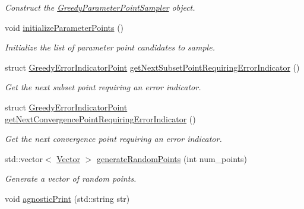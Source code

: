 \begin{DoxyCompactItemize}
\begin{DoxyCompactList}\small\item\em Construct the \hyperlink{class_c_a_r_o_m_1_1_greedy_parameter_point_sampler}{Greedy\-Parameter\-Point\-Sampler} object. \end{DoxyCompactList}\item 
\hypertarget{class_c_a_r_o_m_1_1_greedy_parameter_point_sampler_a1754414b49e091c34b200c84a749c3d3}{void \hyperlink{class_c_a_r_o_m_1_1_greedy_parameter_point_sampler_a1754414b49e091c34b200c84a749c3d3}{initialize\-Parameter\-Points} ()}\label{class_c_a_r_o_m_1_1_greedy_parameter_point_sampler_a1754414b49e091c34b200c84a749c3d3}

\begin{DoxyCompactList}\small\item\em Initialize the list of parameter point candidates to sample. \end{DoxyCompactList}\item 
struct \hyperlink{struct_c_a_r_o_m_1_1_greedy_error_indicator_point}{Greedy\-Error\-Indicator\-Point} \hyperlink{class_c_a_r_o_m_1_1_greedy_parameter_point_sampler_a0be8370ae873e092a743eb7a8c6ae388}{get\-Next\-Subset\-Point\-Requiring\-Error\-Indicator} ()
\begin{DoxyCompactList}\small\item\em Get the next subset point requiring an error indicator. \end{DoxyCompactList}\item 
struct \hyperlink{struct_c_a_r_o_m_1_1_greedy_error_indicator_point}{Greedy\-Error\-Indicator\-Point} \hyperlink{class_c_a_r_o_m_1_1_greedy_parameter_point_sampler_aad4fdc824d3a76fbe47788418d747a83}{get\-Next\-Convergence\-Point\-Requiring\-Error\-Indicator} ()
\begin{DoxyCompactList}\small\item\em Get the next convergence point requiring an error indicator. \end{DoxyCompactList}\item 
std\-::vector$<$ \hyperlink{class_c_a_r_o_m_1_1_vector}{Vector} $>$ \hyperlink{class_c_a_r_o_m_1_1_greedy_parameter_point_sampler_ab543a7f0d3860505789d82a9fcc20638}{generate\-Random\-Points} (int num\-\_\-points)
\begin{DoxyCompactList}\small\item\em Generate a vector of random points. \end{DoxyCompactList}\item 
\hypertarget{class_c_a_r_o_m_1_1_greedy_parameter_point_sampler_a83056d91ce6ab4aaf397adcdce1e7f4c}{void \hyperlink{class_c_a_r_o_m_1_1_greedy_parameter_point_sampler_a83056d91ce6ab4aaf397adcdce1e7f4c}{agnostic\-Print} (std\-::string str)}\label{class_c_a_r_o_m_1_1_greedy_parameter_point_sampler_a83056d91ce6ab4aaf397adcdce1e7f4c}


\end{DoxyCompactItemize}
